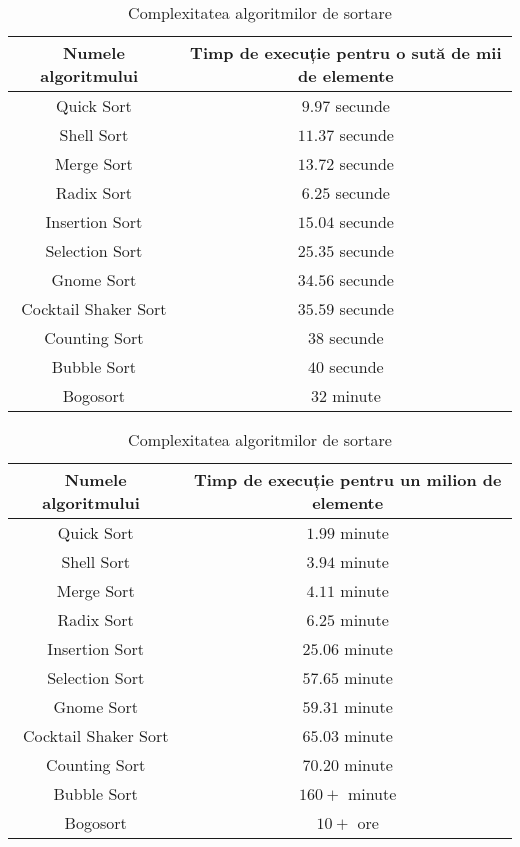 \documentclass[12pt]{article}
\begin{document}
\begin{table}[ht]
\caption{Complexitatea algoritmilor de sortare}
\centering
\begin{tabular}{c c} 
\hline\hline 
Numele algoritmului\ & Timp de execuție pentru o sută de mii de elemente \\ [0.5ex] 

\hline 
Quick Sort & $9.97$ secunde\\ 
Shell Sort & $11.37$ secunde\\
Merge Sort & $13.72$ secunde\\
Radix Sort & $6.25$ secunde\\
Insertion Sort & $15.04$ secunde\\
Selection Sort & $25.35$ secunde\\ 
Gnome Sort & $34.56$ secunde\\
Cocktail Shaker Sort &  $35.59$ secunde\\
Counting Sort&  $38$ secunde\\
Bubble Sort &  $40$ secunde\\
Bogosort &  $32$ minute\\[1ex]

\hline 
\end{tabular}
\label{table:nonlin} 
\end{table}

\begin{table}[ht]
\caption{Complexitatea algoritmilor de sortare}
\centering
\begin{tabular}{c c} 
\hline\hline 
Numele algoritmului\ & Timp de execuție pentru un milion de elemente \\ [0.5ex] 

\hline 
Quick Sort & $1.99$ minute\\ 
Shell Sort & $3.94$ minute\\
Merge Sort & $4.11$ minute\\
Radix Sort & $6.25$ minute \\
Insertion Sort & $25.06$ minute \\
Selection Sort & $57.65$ minute\\ 
Gnome Sort & $59.31$ minute\\
Cocktail Shaker Sort &  $65.03$ minute\\
Counting Sort&  $70.20$ minute\\
Bubble Sort &  $160+$ minute\\
Bogosort &  $10+$ ore\\[1ex]

\hline 
\end{tabular}
\label{table:nonlin} 
\end{table}
\end{document}

